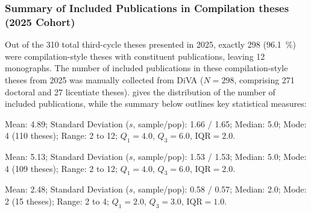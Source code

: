 \documentclass[12pt, twoside]{article}
\begin{document}
\subsubsection{Summary of Included Publications in Compilation theses (2025 Cohort)}
\label{sec:includedPublications2025}
Out of the 310 total third-cycle theses presented in 2025, exactly 298 (\qty{96.1}{\percent}) were compilation-style theses with constituent publications, leaving 12 monographs. The number of included publications in these compilation-style theses from 2025 was manually collected from \gls{DiVA} ($N = 298$, comprising 271 doctoral and 27 licentiate theses).  gives the distribution of the number of included publications, while the summary below outlines key statistical measures:

\begin{description}[style=nextline, labelwidth=\widthof{\textbf{Combined Cohort ($N = 298$)}}, leftmargin=!]
    \item[Combined Cohort ($N = 298$)]
        Mean: 4.89; Standard Deviation ($s$, sample/pop): 1.66 / 1.65; Median: 5.0; Mode: 4 (110 theses); Range: 2 to 12; $Q_1 = 4.0$, $Q_3 = 6.0$, $\text{IQR} = 2.0$.
    \item[Doctoral Theses ($N = 271$)]
        Mean: 5.13; Standard Deviation ($s$, sample/pop): 1.53 / 1.53; Median: 5.0; Mode: 4 (109 theses); Range: 2 to 12; $Q_1 = 4.0$, $Q_3 = 6.0$, $\text{IQR} = 2.0$.
    \item[Licentiate Theses ($N = 27$)]
        Mean: 2.48; Standard Deviation ($s$, sample/pop): 0.58 / 0.57; Median: 2.0; Mode: 2 (15 theses); Range: 2 to 4; $Q_1 = 2.0$, $Q_3 = 3.0$, $\text{IQR} = 1.0$.
\end{description}
\end{document}
